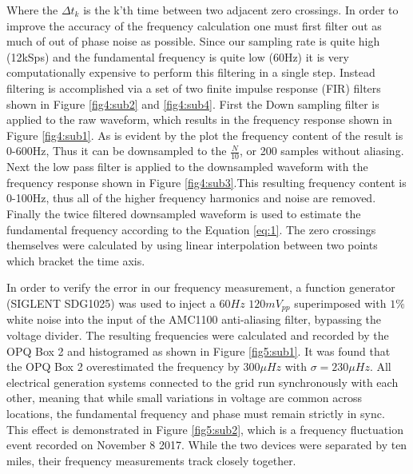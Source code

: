 Where the $\Delta t_{k}$ is the k'th time between two adjacent zero crossings. In order to improve the accuracy of the frequency calculation one must first filter out as much of out of phase noise as possible. Since our sampling rate is quite high (12kSps) and the fundamental frequency is quite low (60Hz) it is very computationally expensive to perform this filtering in a single step. Instead filtering is accomplished via a set of two finite impulse response (FIR) filters shown in Figure \ref{fig4:sub2} and \ref{fig4:sub4}. First the Down sampling filter is applied to the raw waveform, which results in the frequency response shown in Figure \ref{fig4:sub1}. As is evident by the plot the frequency content of the result is 0-600Hz, Thus it can be downsampled to the $\frac{N}{10}$, or 200 samples without aliasing. Next the low pass filter is applied to the downsampled waveform with the frequency response shown in Figure \ref{fig4:sub3}.This resulting frequency content is 0-100Hz, thus all of the higher frequency harmonics and noise are removed. Finally the twice filtered downsampled waveform is used to estimate the fundamental frequency according to the Equation \ref{eq:1}. The zero crossings themselves were calculated by using linear interpolation between two points which bracket the time axis.

In order to verify the error in our frequency measurement, a function generator (SIGLENT SDG1025) was used to inject a $60Hz$ $120mV_{pp}$ superimposed with $1\%$ white noise into the input of the AMC1100 anti-aliasing filter, bypassing the voltage divider. The resulting frequencies were calculated and recorded by the OPQ Box 2 and histogramed as shown in Figure \ref{fig5:sub1}. It was found that the OPQ Box 2 overestimated the frequency by $300\mu Hz$ with $\sigma  = 230\mu Hz$. All electrical generation systems connected to the grid run synchronously with each other, meaning that while small variations in voltage are common across locations, the fundamental frequency and phase must remain strictly in sync. This effect is demonstrated in Figure \ref{fig5:sub2}, which is a frequency fluctuation event recorded on November 8 2017. While the two devices were separated by ten miles, their frequency measurements track closely together.

